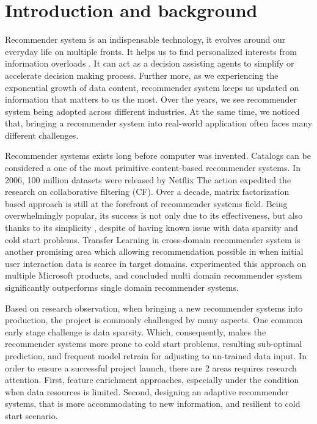 
\section{Introduction and background}
Recommender system is an indispensable technology, it evolves around our everyday life on multiple fronts. It helps us to find personalized interests from information overloads \citep{Lu2015}. It can act as a decision assisting agents to simplify or accelerate decision making process. Further more, as we experiencing the exponential growth of data content, recommender system keeps us updated on information that matters to us the most.
Over the years, we see recommender system being adopted across different industries. At the same time, we noticed that, bringing a recommender system into real-world application often faces many different challenges. 

Recommender systems exists long before computer was invented. Catalogs can be considered a one of the most primitive content-based recommender systems. In 2006, 100 million datasets were released by Netflix \citep{Bennett2007} The action expedited the research on collaborative filtering (CF). Over a decade, matrix factorization based approach is still at the forefront of recommender systems field. Being overwhelmingly popular, its success is not only due to its effectiveness, but also thanks to its simplicity \citep{Amatriain2016}, despite of having known issue with data sparsity and cold start problems. 
Transfer Learning \citep{Pan2010} in cross-domain recommender system is another promising area which allowing recommendation possible in when initial user interaction data is scarce in target domains. \citet{Elkahky2015} experimented this approach on multiple Microsoft products, and concluded multi domain recommender system significantly outperforms single domain recommender systems.  

Based on research observation, when bringing a new recommender systems into production, the project is commonly challenged by many aspects. One common early stage challenge is data sparsity. Which, consequently, makes the recommender systems more prone to cold start problems, resulting sub-optimal prediction, and frequent model retrain for adjusting to un-trained data input. In order to ensure a successful project launch, there are 2 areas requires research attention. First, feature enrichment approaches, especially under the condition when data resources is limited. Second, designing an adaptive recommender systems, that is more accommodating to new information, and resilient to cold start scenario. 

